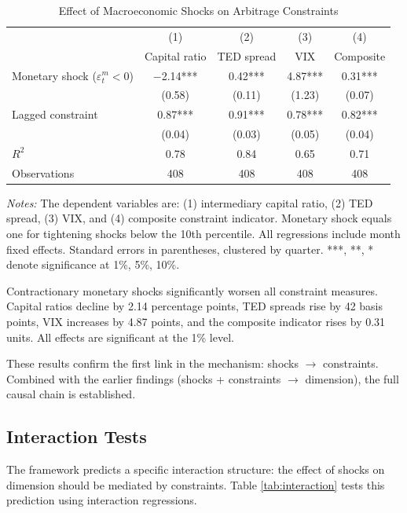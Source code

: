 \documentclass[12pt,letterpaper]{article}
\theoremstyle{plain}
\theoremstyle{definition}
\begin{document}
\begin{table}[htbp]
\centering
\caption{Effect of Macroeconomic Shocks on Arbitrage Constraints}
\label{tab:shock_constraint}
\begin{tabular}{lcccc}
\toprule
& (1) & (2) & (3) & (4) \\
& Capital ratio & TED spread & VIX & Composite \\
\midrule
Monetary shock ($\varepsilon_t^m < 0$) & $-$2.14*** & 0.42*** & 4.87*** & 0.31*** \\
& (0.58) & (0.11) & (1.23) & (0.07) \\[0.3em]
Lagged constraint & 0.87*** & 0.91*** & 0.78*** & 0.82*** \\
& (0.04) & (0.03) & (0.05) & (0.04) \\[0.5em]
$R^2$ & 0.78 & 0.84 & 0.65 & 0.71 \\
Observations & 408 & 408 & 408 & 408 \\
\bottomrule
\end{tabular}

\vspace{0.5em}
\footnotesize
\textit{Notes:} The dependent variables are: (1) intermediary capital ratio, (2) TED spread, (3) VIX, and (4) composite constraint indicator. Monetary shock equals one for tightening shocks below the 10th percentile. All regressions include month fixed effects. Standard errors in parentheses, clustered by quarter. ***, **, * denote significance at 1\%, 5\%, 10\%.
\end{table}

Contractionary monetary shocks significantly worsen all constraint measures. Capital ratios decline by 2.14 percentage points, TED spreads rise by 42 basis points, VIX increases by 4.87 points, and the composite indicator rises by 0.31 units. All effects are significant at the 1\% level.

These results confirm the first link in the mechanism: shocks $\to$ constraints. Combined with the earlier findings (shocks + constraints $\to$ dimension), the full causal chain is established.

\subsection{Interaction Tests}\label{subsec:interaction}

The framework predicts a specific interaction structure: the effect of shocks on dimension should be mediated by constraints. Table \ref{tab:interaction} tests this prediction using interaction regressions.
\end{document}
